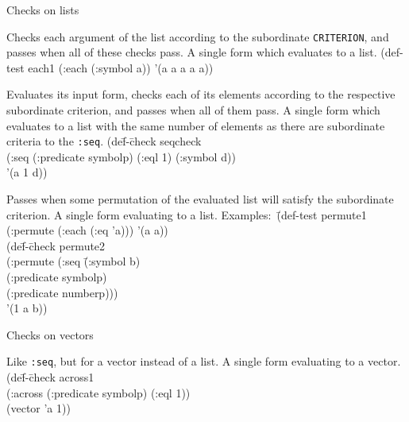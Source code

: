 \begin{criteriaGroup}{Checks on lists}{}

{Checks each argument of the list according to the subordinate
\texttt{CRITERION}, and passes when all of these checks pass.}
{A single form which evaluates to a list.}
{\noExpl}
{\singleEx}
{(def-test each1 (:each (:symbol a)) '(a a a a a))}

{Evaluates its input form, checks each of its elements according to
the respective subordinate criterion, and passes when all of them
pass.}
{A single form which evaluates to a list with the same number of
elements as there are subordinate criteria to the
\texttt{:seq}.}
{}
{\tabbingEx}{
(de\=f-\=check seqcheck
\\ \>\>  (:seq (:predicate symbolp) (:eql 1) (:symbol d))
\\ \>  '(a 1 d))
}

{Passes when some permutation of the evaluated list will satisfy the
subordinate criterion.}
{A single form evaluating to a list.}
{\noExpl}{\tabbingEx}{
\textrm{Examples:}\ \=(def-test permute1 (:permute (:each (:eq 'a))) '(a a))
\\ \> (de\=f-\=check permute2
\\ \> \> \> (:permute (:seq \=(:symbol b)
\\ \> \> \>             \>(:predicate symbolp)
\\ \> \> \>             \>(:predicate numberp)))
\\ \> \>'(1 a b))
}

\end{criteriaGroup}

\begin{criteriaGroup}{Checks on vectors}{}

{Like \texttt{:seq}, but for a vector instead of a list.}
{A single form evaluating to a vector.}
{\noExpl}{\tabbingEx}{
(de\=f-\=check across1
\\ \>\>  (:across (:predicate symbolp) (:eql 1))
\\ \>  (vector 'a 1))}

\end{criteriaGroup}

